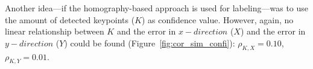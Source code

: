Another idea---if the homography-based approach is used for
labeling---was to use the amount of detected keypoints ($K$) as confidence
value. However, again, no linear relationship between $K$ and the error in $x-direction$ ($X$) and the error in $y-direction$ ($Y$)
could be found (Figure~\ref{fig:cor_sim_confi}): $\rho_{K, X} = 0.10$, $\rho_{K, Y} = 0.01$.